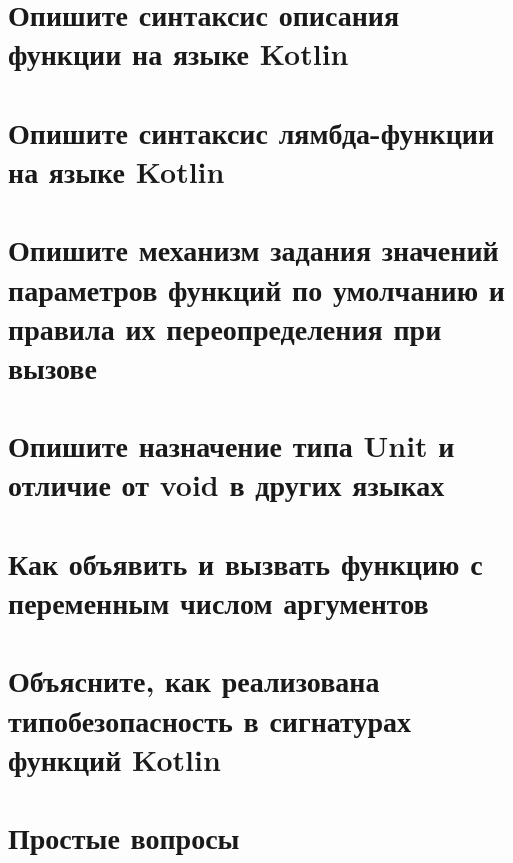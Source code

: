 \documentclass[12pt]{article}
\begin{document}
\section*{Опишите синтаксис описания функции на языке Kotlin}
\begin{enumerate}[leftmargin=*]
\end{enumerate}
\vspace{2mm}
\section*{Опишите синтаксис лямбда-функции на языке Kotlin}
\begin{enumerate}[leftmargin=*]
\end{enumerate}
\vspace{2mm}
\section*{Опишите механизм задания значений параметров функций по умолчанию и правила их переопределения при вызове}
\begin{enumerate}[leftmargin=*]
\end{enumerate}
\vspace{2mm}
\section*{Опишите назначение типа Unit и отличие от void в других языках}
\begin{enumerate}[leftmargin=*]
\end{enumerate}
\vspace{2mm}
\section*{Как объявить и вызвать функцию с переменным числом аргументов}
\begin{enumerate}[leftmargin=*]
\end{enumerate}
\vspace{2mm}
\section*{Объясните, как реализована типобезопасность в сигнатурах функций Kotlin}
\begin{enumerate}[leftmargin=*]
\end{enumerate}
\vspace{2mm}
\section*{Простые вопросы}
\begin{enumerate}[leftmargin=*]
\end{enumerate}
\vspace{2mm}
\end{document}
